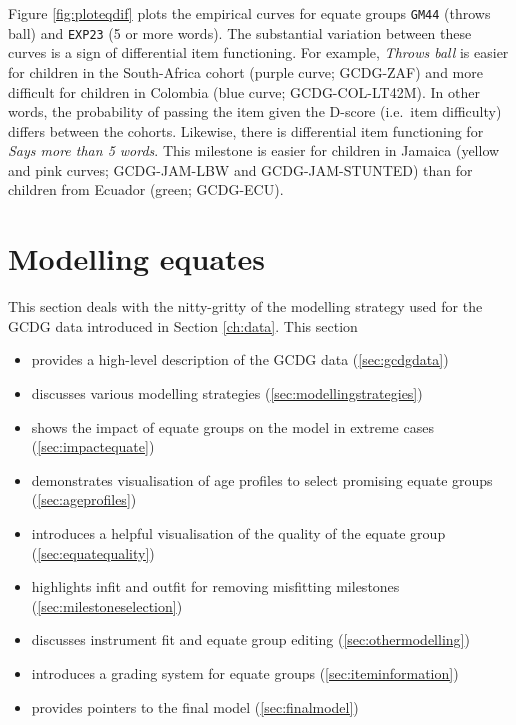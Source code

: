 \documentclass[
]{book}
\providecommand{\tightlist}{%
  \setlength{\itemsep}{0pt}\setlength{\parskip}{0pt}}
\begin{document}
Figure \ref{fig:ploteqdif} plots the empirical curves for equate groups \texttt{GM44} (throws ball) and \texttt{EXP23} (5 or more words). The substantial variation between these curves is a sign of differential item functioning. For example, \emph{Throws ball} is easier for children in the South-Africa cohort (purple curve; GCDG-ZAF) and more difficult for children in Colombia (blue curve; GCDG-COL-LT42M). In other words, the probability of passing the item given the D-score (i.e.~item difficulty) differs between the cohorts. Likewise, there is differential item functioning for \emph{Says more than 5 words}. This milestone is easier for children in Jamaica (yellow and pink curves; GCDG-JAM-LBW and GCDG-JAM-STUNTED) than for children from Ecuador (green; GCDG-ECU).

\newpage

\hypertarget{ch:modellingequates}{%
\chapter{Modelling equates}\label{ch:modellingequates}}

This section deals with the nitty-gritty of the modelling strategy used for the GCDG data introduced in Section \ref{ch:data}. This section

\begin{itemize}
\tightlist
\item
  provides a high-level description of the GCDG data (\ref{sec:gcdgdata})
\item
  discusses various modelling strategies (\ref{sec:modellingstrategies})
\item
  shows the impact of equate groups on the model in extreme cases (\ref{sec:impactequate})
\item
  demonstrates visualisation of age profiles to select promising equate groups (\ref{sec:ageprofiles})
\item
  introduces a helpful visualisation of the quality of the equate group (\ref{sec:equatequality})
\item
  highlights infit and outfit for removing misfitting milestones (\ref{sec:milestoneselection})
\item
  discusses instrument fit and equate group editing (\ref{sec:othermodelling})
\item
  introduces a grading system for equate groups (\ref{sec:iteminformation})
\item
  provides pointers to the final model (\ref{sec:finalmodel})
\end{itemize}
\end{document}
